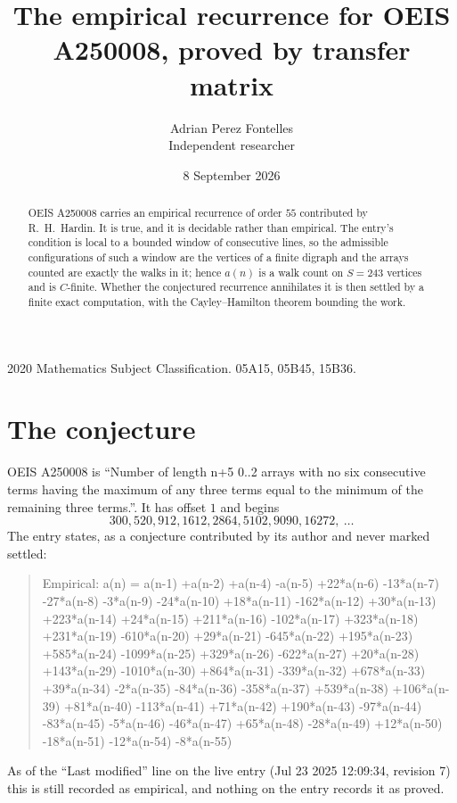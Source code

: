 \documentclass[11pt,a4paper]{article}
\title{The empirical recurrence for OEIS A250008, proved by transfer matrix}
\author{Adrian Perez Fontelles\\ \small Independent researcher}
\date{8 September 2026}
\theoremstyle{plain}
\theoremstyle{definition}
\begin{document}
\maketitle

\begin{abstract}
OEIS A250008 carries an empirical recurrence of order $55$ contributed by R.~H.~Hardin. It is
true, and it is decidable rather than empirical. The entry's condition is local to a bounded window of consecutive lines, so
the admissible configurations of such a window are the vertices of a finite digraph and the
arrays counted are exactly the walks in it; hence $a(n)$ is a walk count on $S=243$ vertices
and is $C$-finite. Whether the conjectured recurrence annihilates it is then settled by a
finite exact computation, with the Cayley--Hamilton theorem bounding the work.
\end{abstract}

\noindent\small 2020 Mathematics Subject Classification. 05A15, 05B45, 15B36.\normalsize

\section{The conjecture}

OEIS A250008 is ``Number of length n+5 0..2 arrays with no six consecutive terms having the maximum of any three terms equal to the minimum of the remaining three terms.''. It has offset $1$ and begins
\[
300, 520, 912, 1612, 2864, 5102, 9090, 16272,\ \dots
\]
The entry states, as a conjecture contributed by its author and never marked settled:
\begin{quote}
Empirical: a(n) = a(n-1) +a(n-2) +a(n-4) -a(n-5) +22*a(n-6) -13*a(n-7) -27*a(n-8) -3*a(n-9) -24*a(n-10) +18*a(n-11) -162*a(n-12) +30*a(n-13) +223*a(n-14) +24*a(n-15) +211*a(n-16) -102*a(n-17) +323*a(n-18) +231*a(n-19) -610*a(n-20) +29*a(n-21) -645*a(n-22) +195*a(n-23) +585*a(n-24) -1099*a(n-25) +329*a(n-26) -622*a(n-27) +20*a(n-28) +143*a(n-29) -1010*a(n-30) +864*a(n-31) -339*a(n-32) +678*a(n-33) +39*a(n-34) -2*a(n-35) -84*a(n-36) -358*a(n-37) +539*a(n-38) +106*a(n-39) +81*a(n-40) -113*a(n-41) +71*a(n-42) +190*a(n-43) -97*a(n-44) -83*a(n-45) -5*a(n-46) -46*a(n-47) +65*a(n-48) -28*a(n-49) +12*a(n-50) -18*a(n-51) -12*a(n-54) -8*a(n-55)
\end{quote}
As of the ``Last modified'' line on the live entry (Jul 23 2025 12:09:34, revision 7) this is still
recorded as empirical, and nothing on the entry records it as proved.
\end{document}
